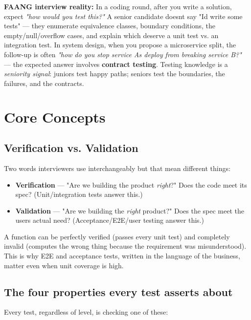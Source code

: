 \documentclass[11pt]{article}
\providecommand{\tightlist}{\setlength{\itemsep}{1pt}\setlength{\parskip}{0pt}}
\begin{document}
\textbf{FAANG interview reality:} In a coding round, after you write a solution, expect \emph{"how would you test this?"} A senior candidate doesn\textquotesingle t say "I\textquotesingle d write some tests" --- they enumerate equivalence classes, boundary conditions, the empty/null/overflow cases, and explain which deserve a unit test vs. an integration test. In system design, when you propose a microservice split, the follow-up is often \emph{"how do you stop service A\textquotesingle s deploy from breaking service B?"} --- the expected answer involves \textbf{contract testing}. Testing knowledge is a \emph{seniority signal}: juniors test happy paths; seniors test the boundaries, the failures, and the contracts.

\section{Core Concepts}\label{core-concepts}

\subsection{Verification vs. Validation}\label{verification-vs-validation}

Two words interviewers use interchangeably but that mean different things:

\begin{itemize}
\tightlist
\item
  \textbf{Verification} --- "Are we building the product \emph{right}?" Does the code meet its spec? (Unit/integration tests answer this.)
\item
  \textbf{Validation} --- "Are we building the \emph{right} product?" Does the spec meet the user\textquotesingle s actual need? (Acceptance/E2E/user testing answer this.)
\end{itemize}

A function can be perfectly verified (passes every unit test) and completely invalid (computes the wrong thing because the requirement was misunderstood). This is why E2E and acceptance tests, written in the language of the business, matter even when unit coverage is high.

\subsection{The four properties every test asserts about}\label{the-four-properties-every-test-asserts-about}

Every test, regardless of level, is checking one of these:
\end{document}
